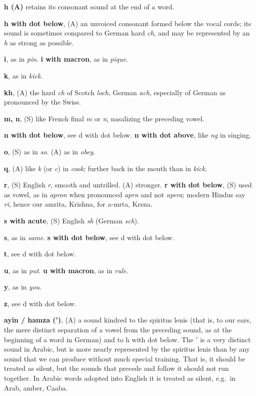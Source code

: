 \documentclass[11pt,a4paper]{article}
\begin{document}
\smallskip
\noindent\textbf{h (A)} retains its consonant sound at the end of a word.

\smallskip
\noindent\textbf{h with dot below}, (A) an unvoiced consonant formed below the vocal cords; its sound is sometimes compared to German hard \textit{ch}, and may be represented by an \textit{h} as strong as possible.

\smallskip
\noindent\textbf{i}, as in \textit{pin}. \textbf{i with macron}, as in \textit{pique}.

\smallskip
\noindent\textbf{k}, as in \textit{kick}.

\smallskip
\noindent\textbf{kh}, (A) the hard \textit{ch} of Scotch \textit{loch}, German \textit{ach}, especially of German as pronounced by the Swiss.

\smallskip
\noindent\textbf{m, n}, (S) like French final \textit{m} or \textit{n}, nasalizing the preceding vowel.

\smallskip
\noindent\textbf{n with dot below}, see d with dot below. \textbf{n with dot above}, like \textit{ng} in singing.

\smallskip
\noindent\textbf{o}, (S) as in \textit{so}. (A) as in \textit{obey}.

\smallskip
\noindent\textbf{q}, (A) like \textit{k} (or \textit{c}) in \textit{cook}; further back in the mouth than in \textit{kick}.

\smallskip
\noindent\textbf{r}, (S) English \textit{r}, smooth and untrilled. (A) stronger. \textbf{r with dot below}, (S) used as vowel, as in \textit{apron} when pronounced \textit{aprn} and not \textit{apera}; modern Hindus say \textit{ri}, hence our amrita, Krishna, for a-mrta, Krsna.

\smallskip
\noindent\textbf{s with acute}, (S) English \textit{sh} (German \textit{sch}).

\smallskip
\noindent\textbf{s}, as in \textit{same}. \textbf{s with dot below}, see d with dot below.

\smallskip
\noindent\textbf{t}, see d with dot below.

\smallskip
\noindent\textbf{u}, as in \textit{put}. \textbf{u with macron}, as in \textit{rule}.

\smallskip
\noindent\textbf{y}, as in \textit{you}.

\smallskip
\noindent\textbf{z}, see d with dot below.

\smallskip
\noindent\textbf{ayin / hamza (')}, (A) a sound kindred to the spiritus lenis (that is, to our ears, the mere distinct separation of a vowel from the preceding sound, as at the beginning of a word in German) and to h with dot below. The $'$ is a very distinct sound in Arabic, but is more nearly represented by the spiritus lenis than by any sound that we can produce without much special training. That is, it should be treated as silent, but the sounds that precede and follow it should not run together. In Arabic words adopted into English it is treated as silent, e.g.\ in Arab, amber, Caaba.
\end{document}

